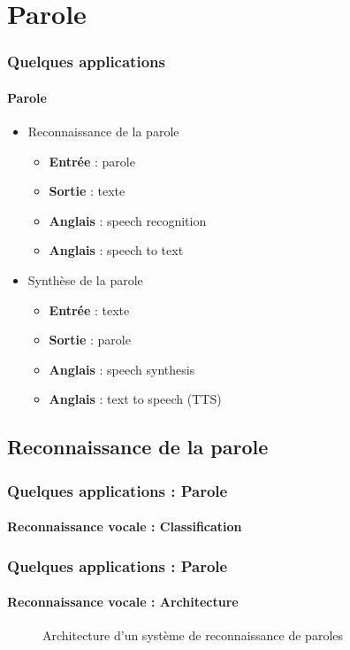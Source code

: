 \documentclass[xcolor=table]{beamer}
\begin{document}
\section{Parole}

\begin{frame}
	\frametitle{Quelques applications}
	\framesubtitle{Parole}
	\begin{itemize}
		\item Reconnaissance de la parole
		\begin{itemize}
			\item \textbf{Entrée} : parole
			\item \textbf{Sortie} : texte
			\item \textbf{Anglais} : speech recognition
			\item \textbf{Anglais} : speech to text
		\end{itemize}
		\item Synthèse de la parole
		\begin{itemize}
			\item \textbf{Entrée} : texte
			\item \textbf{Sortie} : parole
			\item \textbf{Anglais} : speech synthesis
			\item \textbf{Anglais} : text to speech (TTS)
		\end{itemize}
	\end{itemize}
\end{frame}

\subsection{Reconnaissance de la parole}

\begin{frame}
	\frametitle{Quelques applications : Parole}
	\framesubtitle{Reconnaissance vocale : Classification}
\end{frame}


\begin{frame}
	\frametitle{Quelques applications : Parole}
	\framesubtitle{Reconnaissance vocale : Architecture}
	\begin{figure}
		\centering
		\caption{Architecture d'un système de reconnaissance de paroles \cite{18-haridas}}
	\end{figure}
\end{frame}
\end{document}
